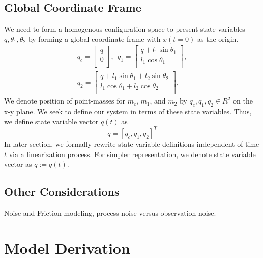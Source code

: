\documentclass[journal]{IEEEtran}
\begin{document}
\subsection{Global Coordinate Frame}
We need to form a homogenous configuration space to present state variables
\(q, \theta_1, \theta_2\) by forming a global coordinate frame with \(x(t=0)\)
as the origin.
\begin{equation}
    \begin{split}
    q_c = \begin{bmatrix}
    q \\
    0 \\
    \end{bmatrix}, ~~
    q_1 = \begin{bmatrix}
    q + l_1 \sin \theta_1 \\
    l_1 \cos \theta_1 \\
    \end{bmatrix}, \\
    q_2 = \begin{bmatrix}
    q + l_1 \sin \theta_1 + l_2 \sin \theta_2 \\
    l_1 \cos \theta_1 + l_2 \cos \theta_2 \\
\end{bmatrix},
\end{split}
\end{equation}
\noindent
We denote position of point-masses for \(m_c\), \(m_1\), and
\(m_2\) by \(q_c, q_1, q_2 \in R^2\) on the x-y plane.
We seek to define our system in terms of these state variables. Thus, we define
state variable vector \(q(t)\) as
\begin{equation}
q = [q_c, q_1, q_2]^{T}
\end{equation}
In later section, we formally rewrite state variable definitions independent of
time \(t\) via a linearization process. For simpler representation, we
denote state variable vector as \(q:=q(t)\).

\subsection{Other Considerations}
Noise and Friction modeling, process noise versus observation noise.

\section{Model Derivation}
\end{document}
